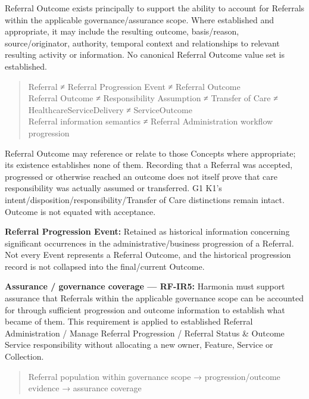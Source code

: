 Referral Outcome exists principally to support the ability to account for Referrals within the applicable governance/assurance scope. Where established and appropriate, it may include the resulting outcome, basis/reason, source/originator, authority, temporal context and relationships to relevant resulting activity or information. No canonical Referral Outcome value set is established.



\begin{quote}\small\ttfamily
Referral ≠ Referral Progression Event ≠ Referral Outcome\\
Referral Outcome ≠ Responsibility Assumption ≠ Transfer of Care ≠ HealthcareServiceDelivery ≠ ServiceOutcome\\
Referral information semantics ≠ Referral Administration workflow progression\\

\end{quote}


Referral Outcome may reference or relate to those Concepts where appropriate; its existence establishes none of them. Recording that a Referral was accepted, progressed or otherwise reached an outcome does not itself prove that care responsibility was actually assumed or transferred. G1 K1's intent/disposition/responsibility/Transfer of Care distinctions remain intact. Outcome is not equated with acceptance.



\textbf{Referral Progression Event:} Retained as historical information concerning significant occurrences in the administrative/business progression of a Referral. Not every Event represents a Referral Outcome, and the historical progression record is not collapsed into the final/current Outcome.



\textbf{Assurance / governance coverage — RF-IR5:} Harmonia must support assurance that Referrals within the applicable governance scope can be accounted for through sufficient progression and outcome information to establish what became of them. This requirement is applied to established Referral Administration / Manage Referral Progression / Referral Status \& Outcome Service responsibility without allocating a new owner, Feature, Service or Collection.



\begin{quote}\small\ttfamily
Referral population within governance scope → progression/outcome evidence → assurance coverage\\

\end{quote}



